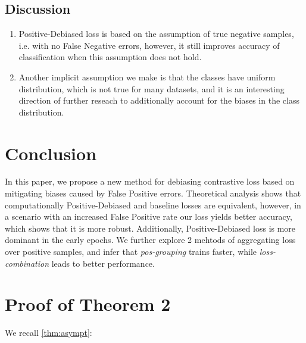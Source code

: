 \documentclass{article}
\begin{document}
\subsection{Discussion}
\begin{enumerate}
    \item Positive-Debiased loss is based on the assumption of true negative samples, i.e. with no False Negative errors, however, it still improves accuracy of classification when this assumption does not hold.
    \item Another implicit assumption we make is that the classes have uniform distribution, which is not true for many datasets, and it is an interesting direction of further reseach to additionally account for the biases in the class distribution.
\end{enumerate}

\section{Conclusion}
In this paper, we propose a new method for debiasing contrastive loss based on mitigating biases caused by False Positive errors. Theoretical analysis shows that computationally Positive-Debiased and baseline losses are equivalent, however, in a scenario with an increased False Positive rate our loss yields better accuracy, which shows that it is more robust. Additionally, Positive-Debiased loss is more dominant in the early epochs. We further explore 2 mehtods of aggregating loss over positive samples, and infer that \textit{pos-grouping} trains faster, while \textit{loss-combination} leads to better performance. 




\clearpage



\appendix
\newpage
\section{Proof of Theorem 2}
We recall \cref{thm:asympt}:

\asympt*
\end{document}
